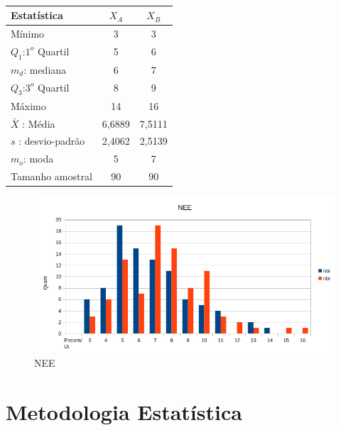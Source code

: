 \\
\begin{minipage}[!b]{0.40\linewidth}
\begin{tabular}{ l c c }
\hline
Estatística & $X_A$ & $X_B$ \\
\hline
Mínimo & 3 & 3 \\
$Q_1$:$1^o$ Quartil & 5 & 6 \\
$m_d$: mediana & 6 & 7 \\
$Q_3$:$3^o$ Quartil & 8 & 9 \\
Máximo & 14 & 16 \\
\hline
$\bar{X}$ : Média & 6,6889 & 7,5111 \\
$s$ : desvio-padrão & 2,4062 & 2,5139\\
$m_o$: moda & 5 & 7\\
\hline
Tamanho amostral & 90 & 90 \\
\hline
\end{tabular}
\label{Tab:Resulatdos}
\end{minipage}
\hspace{1cm}
\begin{minipage}[!b]{0.40\linewidth}
\begin{figure}[H]
\centering
\includegraphics[scale=0.5]{./image/NEE.png}
\caption{NEE}
\label{NEE}
\end{figure}
\end{minipage}












\newpage






\section{Metodologia Estatística}\label{Metodos}
